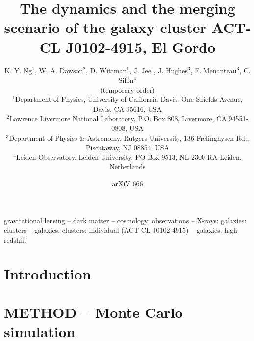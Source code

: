 
\title[El Gordo]{The dynamics and the merging scenario of the galaxy cluster 
ACT-CL J0102-4915, 
El Gordo}
\author[author]{K. Y. Ng$^{1}$, W. A. Dawson$^{2}$, D. Wittman$^{1}$, J.
Jee$^{1}$, J. Hughes$^{3}$, F. Menanteau$^{3}$, C. Sif\'{o}n$^{4}$\\
(temporary order)\\
$^{1}$Department of Physics, University of California Davis, One Shields
Avenue, Davis, CA 95616, USA\\ 
$^{2}$Lawrence Livermore National Laboratory, P.O. Box 808, Livermore, CA
94551-0808, USA \\
$^3$Department of Physics \& Astronomy,
Rutgers University, 136 Frelinghysen Rd., Piscataway, NJ 08854, USA\\
$^{4}$Leiden Observatory, Leiden University, PO Box 9513, NL-2300 RA
Leiden, Netherlands\\}



\date{arXiV 666} \pagerange{\pageref{firstpage}--\pageref{lastpage}}
 \maketitle \label{firstpage}
\begin{abstract} 
    
\end{abstract}

\begin{keywords}
gravitational lensing -- dark matter -- cosmology: observations -- X-rays:
galaxies: clusters -- galaxies: clusters: individual (ACT-CL J0102-4915) --
galaxies: high redshift 
\end{keywords}

\section{Introduction} 


\section[]{METHOD -- Monte Carlo simulation} 


